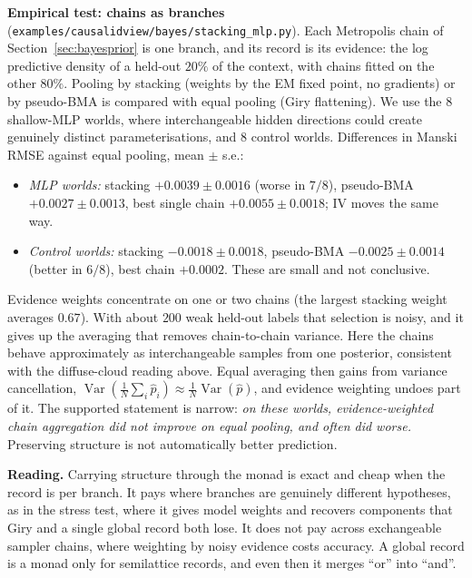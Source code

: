 \documentclass[11pt]{article}
\theoremstyle{definition}
\theoremstyle{remark}
\begin{document}
\textbf{Empirical test: chains as branches} (\texttt{examples/causalidview/bayes/stacking\_mlp.py}). Each Metropolis chain of Section~\ref{sec:bayesprior} is one branch, and its record is its evidence: the log predictive density of a held-out $20\%$ of the context, with chains fitted on the other $80\%$. Pooling by stacking \cite{yao22stacking} (weights by the EM fixed point, no gradients) or by pseudo-BMA is compared with equal pooling (Giry flattening). We use the $8$ shallow-MLP worlds, where interchangeable hidden directions could create genuinely distinct parameterisations, and $8$ control worlds. Differences in Manski RMSE against equal pooling, mean $\pm$ s.e.:
\begin{itemize}
  \item \emph{MLP worlds:} stacking $+0.0039\pm0.0016$ (worse in $7/8$), pseudo-BMA $+0.0027\pm0.0013$, best single chain $+0.0055\pm0.0018$; IV moves the same way.
  \item \emph{Control worlds:} stacking $-0.0018\pm0.0018$, pseudo-BMA $-0.0025\pm0.0014$ (better in $6/8$), best chain $+0.0002$. These are small and not conclusive.
\end{itemize}
Evidence weights concentrate on one or two chains (the largest stacking weight averages $0.67$). With about $200$ weak held-out labels that selection is noisy, and it gives up the averaging that removes chain-to-chain variance. Here the chains behave approximately as interchangeable samples from one posterior, consistent with the diffuse-cloud reading above. Equal averaging then gains from variance cancellation, $\operatorname{Var}(\tfrac1N\sum_i\hat p_i)\approx\tfrac1N\operatorname{Var}(\hat p)$, and evidence weighting undoes part of it. The supported statement is narrow: \emph{on these worlds, evidence-weighted chain aggregation did not improve on equal pooling, and often did worse.} Preserving structure is not automatically better prediction.

\textbf{Reading.} Carrying structure through the monad is exact and cheap when the record is per branch. It pays where branches are genuinely different hypotheses, as in the stress test, where it gives model weights and recovers components that Giry and a single global record both lose. It does not pay across exchangeable sampler chains, where weighting by noisy evidence costs accuracy. A global record is a monad only for semilattice records, and even then it merges ``or'' into ``and''.
\end{document}
